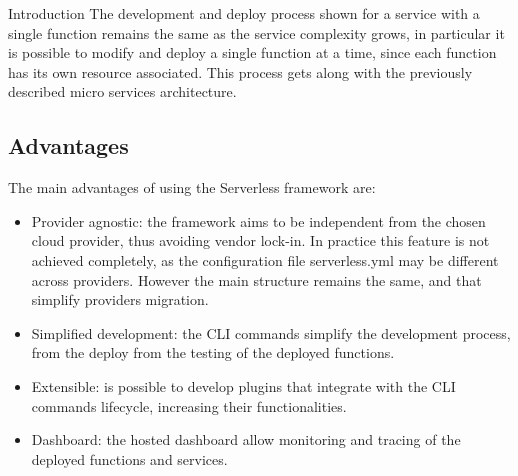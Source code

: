 \begin{chapter}{Introduction}
    The development and deploy process shown for a service with a single function
    remains the same as the service complexity grows, in particular it is possible to
    modify and deploy a single function at a time, since each function has its own
    resource associated.
    This process gets along with the previously described micro services architecture.

    \subsection{Advantages}
    The main advantages of using the Serverless framework are:
    \begin{itemize}
        \item Provider agnostic: the framework aims to be independent from the chosen
            cloud provider, thus avoiding vendor lock-in. In practice this feature is
            not achieved completely, as the configuration file serverless.yml may be
            different across providers. However the main structure remains the same,
            and that simplify providers migration.
        \item Simplified development: the CLI commands simplify the development process,
            from the deploy from the testing of the deployed functions.
        \item Extensible: is possible to develop plugins that integrate with the
            CLI commands lifecycle, increasing their functionalities.
        \item Dashboard: the hosted dashboard allow monitoring and tracing of the
            deployed functions and services.
    \end{itemize}


\end{chapter}
